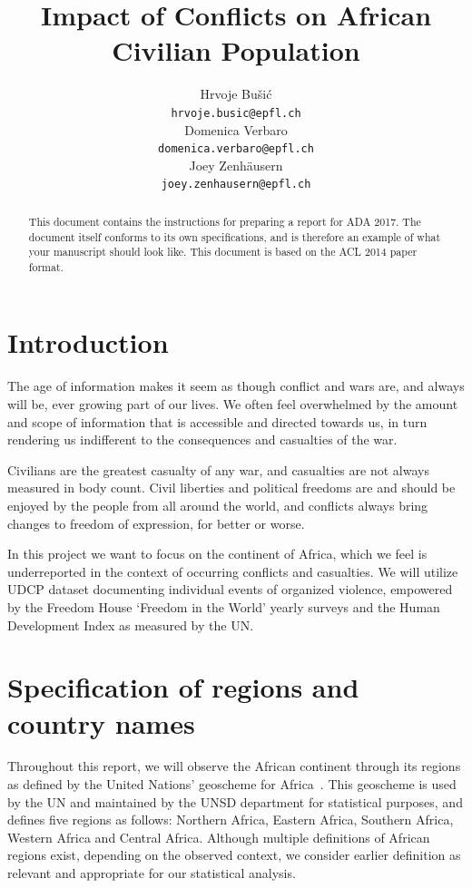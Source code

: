 \documentclass[a4paper,11pt]{article}
\title{Impact of Conflicts on African Civilian Population}
\author{Hrvoje Bušić \\
  \small{\tt hrvoje.busic@epfl.ch} \\\And
  Domenica Verbaro\\
  \small{\tt domenica.verbaro@epfl.ch} \\\And
Joey Zenhäusern\\
\small{\tt joey.zenhausern@epfl.ch} \\}
\date{}
\begin{document}
\maketitle
\begin{abstract}
  This document contains the instructions for preparing a report for ADA 2017. The document itself conforms to its own specifications, and is therefore an example of
  what your manuscript should look like. This document is based on the ACL 2014 paper format.
\end{abstract}

\section{Introduction}

The age of information makes it seem as though conflict and wars are, and always will be, ever growing part of our lives. We often feel overwhelmed by the amount and scope of information that is accessible and directed towards us, in turn rendering us indifferent to the consequences and casualties of the war.

Civilians are the greatest casualty of any war, and casualties are not always measured in body count. Civil liberties and political freedoms are and should be enjoyed by the people from all around the world, and conflicts always bring changes to freedom of expression, for better or worse.

In this project we want to focus on the continent of Africa, which we feel is underreported in the context of occurring conflicts and casualties. We will utilize UDCP dataset documenting individual events of organized violence, empowered by the Freedom House `Freedom in the World' yearly surveys and the Human Development Index as measured by the UN.

\section{Specification of regions and country
names}

Throughout this report, we will observe the African continent through its
regions as defined by the United Nations' geoscheme for Africa~\cite{UNGeoscheme}. This geoscheme is used by the UN and
maintained by the UNSD department for statistical purposes, and defines
five regions as follows: Northern Africa, Eastern Africa, Southern
Africa, Western Africa and Central Africa. Although multiple definitions
of African regions exist, depending on the observed context, we consider
earlier definition as relevant and appropriate for our statistical
analysis.
\end{document}
